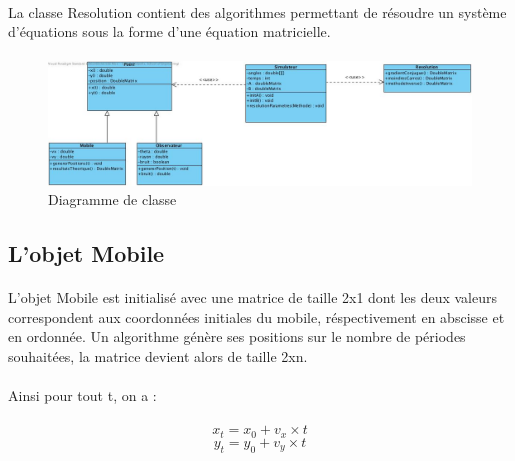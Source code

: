 \documentclass[a4paper,11pt]{article}
\begin{document}
		\paragraph{}
		La classe Resolution contient des algorithmes permettant de résoudre un système d’équations sous la forme d'une équation matricielle.
	
		\paragraph{}
		\begin{figure}[h]
			\centerline{\includegraphics[scale=0.50]{img/diagramme.jpg}}
			\caption{Diagramme de classe}
			\label{diagramme-composants}
		\end{figure}

		\subsection{L'objet Mobile}
		\paragraph{}
		L'objet Mobile est initialisé avec une matrice de taille 2x1 dont les deux valeurs correspondent aux coordonnées initiales du mobile, réspectivement en abscisse et en ordonnée. Un algorithme génère ses positions sur le nombre de périodes souhaitées, la matrice devient alors de taille 2xn. 
		
		\paragraph{}
		Ainsi pour tout t, on a :
	
		\paragraph{}
			\begin{equation} 
				x_{t} = x_{0} + v_{x} \times t 
			\end{equation}
			\begin{equation} 
				y_{t} = y_{0} + v_{y} \times t 
			\end{equation}
\end{document}
